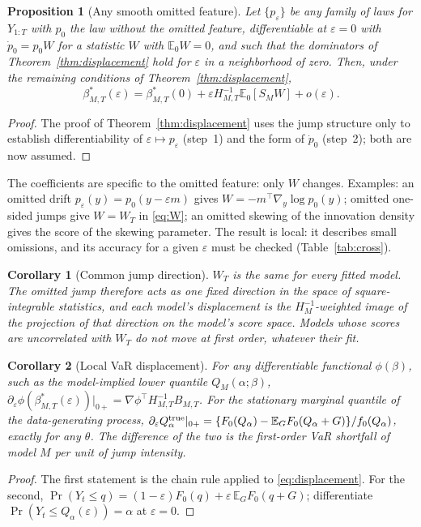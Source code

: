 \documentclass[11pt,a4paper]{article}
\newtheorem{proposition}{Proposition}
\newtheorem{corollary}{Corollary}
\theoremstyle{definition}
\theoremstyle{remark}
\newcommand{\E}{\mathbb{E}}
\newcommand{\tr}{^{\top}}
\begin{document}
\begin{proposition}[Any smooth omitted feature]\label{prop:general}
Let $\{p_\varepsilon\}$ be any family of laws for $Y_{1:T}$ with $p_0$ the law without the omitted feature, differentiable at $\varepsilon=0$ with $\dot p_0=p_0W$ for a statistic $W$ with $\E_0W=0$, and such that the dominators of Theorem~\ref{thm:displacement} hold for $\varepsilon$ in a neighborhood of zero. Then, under the remaining conditions of Theorem~\ref{thm:displacement},
\[
\beta^*_{M,T}(\varepsilon)=\beta^*_{M,T}(0)+\varepsilon H_{M,T}^{-1}\E_0[S_MW]+o(\varepsilon).
\]
\end{proposition}
\begin{proof}
The proof of Theorem~\ref{thm:displacement} uses the jump structure only to establish differentiability of $\varepsilon\mapsto p_\varepsilon$ (step~1) and the form of $\dot p_0$ (step~2); both are now assumed.
\end{proof}
\noindent The coefficients are specific to the omitted feature: only $W$ changes. Examples: an omitted drift $p_\varepsilon(y)=p_0(y-\varepsilon m)$ gives $W=-m\tr\nabla_y\log p_0(y)$; omitted one-sided jumps give $W=W_T$ in \eqref{eq:W}; an omitted skewing of the innovation density gives the score of the skewing parameter. The result is local: it describes small omissions, and its accuracy for a given $\varepsilon$ must be checked (Table~\ref{tab:cross}).

\begin{corollary}[Common jump direction]\label{cor:common}
$W_T$ is the same for every fitted model. The omitted jump therefore acts as one fixed direction in the space of square-integrable statistics, and each model's displacement is the $H_M^{-1}$-weighted image of the projection of that direction on the model's score space. Models whose scores are uncorrelated with $W_T$ do not move at first order, whatever their fit.
\end{corollary}

\begin{corollary}[Local VaR displacement]\label{cor:var}
For any differentiable functional $\phi(\beta)$, such as the model-implied lower quantile $Q_M(\alpha;\beta)$, $\partial_\varepsilon\phi(\beta^*_{M,T}(\varepsilon))|_{0+}=\nabla\phi\tr H_{M,T}^{-1}B_{M,T}$. For the stationary marginal quantile of the data-generating process, $\partial_\varepsilon Q^{\rm true}_\alpha|_{0+}=\{F_0(Q_\alpha)-\E_GF_0(Q_\alpha+G)\}/f_0(Q_\alpha)$, exactly for any $\theta$. The difference of the two is the first-order VaR shortfall of model $M$ per unit of jump intensity.
\end{corollary}
\begin{proof}
The first statement is the chain rule applied to \eqref{eq:displacement}. For the second, $\Pr(Y_t\le q)=(1-\varepsilon)F_0(q)+\varepsilon\,\E_GF_0(q+G)$; differentiate $\Pr(Y_t\le Q_\alpha(\varepsilon))=\alpha$ at $\varepsilon=0$.
\end{proof}
\end{document}
